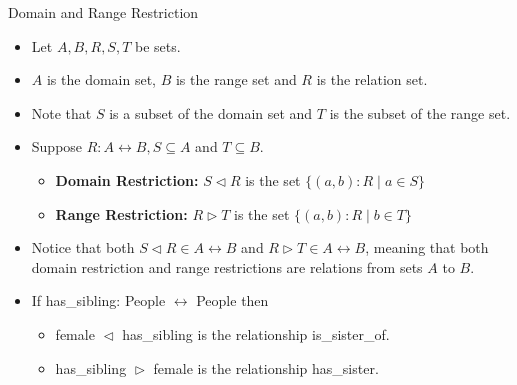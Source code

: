 \documentclass[aspectratio=169]{beamer}
\begin{document}
\begin{frame}{Domain and Range Restriction}
\begin{itemize}
    \item Let $A, B, R, S, T$ be sets.
    \item $A$ is the domain set, $B$ is the range set and $R$ is the relation set.
    \item Note that $S$ is a subset of the domain set and $T$ is the subset of the range set.
    \item Suppose $R: A \leftrightarrow B, S \subseteq A$ and $T \subseteq B$.
    \begin{itemize}
        \item \textbf{Domain Restriction:} $S \vartriangleleft R$ is the set $\{(a, b): R \mid a \in S\}$
        \item \textbf{Range Restriction:} $R \vartriangleright T$ is the set $\{(a, b): R \mid b \in T\}$
    \end{itemize}
    \item Notice that both $S \vartriangleleft R \in A \leftrightarrow B$ and $R \vartriangleright T \in A \leftrightarrow B$, meaning that both domain restriction and range restrictions are relations from sets $A$ to $B$.
    \item If has\_sibling: People $\leftrightarrow$ People then
    \begin{itemize}
        \item female $\vartriangleleft$ has\_sibling is the relationship is\_sister\_of.
        \item has\_sibling $\vartriangleright$ female is the relationship has\_sister.
    \end{itemize}
\end{itemize}
\end{frame}
\end{document}
